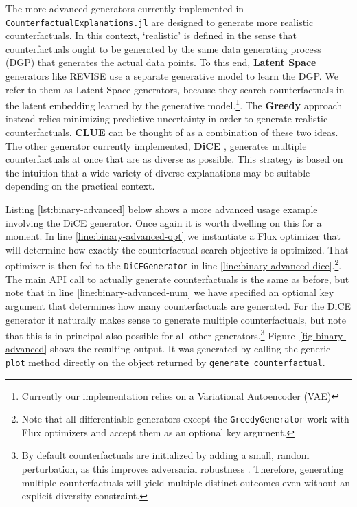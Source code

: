 \documentclass[
  letterpaper,
  DIV=11,
  numbers=noendperiod]{scrartcl}
\begin{document}
The more advanced generators currently implemented in
\texttt{CounterfactualExplanations.jl} are designed to generate more
realistic counterfactuals. In this context, `realistic' is defined in
the sense that counterfactuals ought to be generated by the same data
generating process (DGP) that generates the actual data points. To this
end, \textbf{Latent Space} generators like REVISE
\cite{joshi2019realistic} use a separate generative model to learn the
DGP. We refer to them as Latent Space generators, because they search
counterfactuals in the latent embedding learned by the generative
model.\footnote{Currently our implementation relies on a Variational
  Autoencoder (VAE)}. The \textbf{Greedy} approach
\cite{schut2021generating} instead relies minimizing predictive
uncertainty in order to generate realistic counterfactuals.
\textbf{CLUE} \cite{antoran2020getting} can be thought of as a
combination of these two ideas. The other generator currently
implemented, \textbf{DiCE} \cite{mothilal2020explaining}, generates
multiple counterfactuals at once that are as diverse as possible. This
strategy is based on the intuition that a wide variety of diverse
explanations may be suitable depending on the practical context.

Listing \ref{lst:binary-advanced} below shows a more advanced usage
example involving the DiCE generator. Once again it is worth dwelling on
this for a moment. In line \ref{line:binary-advanced-opt} we instantiate
a Flux optimizer that will determine how exactly the counterfactual
search objective is optimized. That optimizer is then fed to the
\texttt{DiCEGenerator} in line
\ref{line:binary-advanced-dice}.\footnote{Note that all differentiable
  generators except the \texttt{GreedyGenerator} work with Flux
  optimizers and accept them as an optional key argument.}. The main API
call to actually generate counterfactuals is the same as before, but
note that in line \ref{line:binary-advanced-num} we have specified an
optional key argument that determines how many counterfactuals are
generated. For the DiCE generator it naturally makes sense to generate
multiple counterfactuals, but note that this is in principal also
possible for all other generators.\footnote{By default counterfactuals
  are initialized by adding a small, random perturbation, as this
  improves adversarial robustness \cite{slack2021counterfactual}.
  Therefore, generating multiple counterfactuals will yield multiple
  distinct outcomes even without an explicit diversity constraint.}
Figure~\ref{fig-binary-advanced} shows the resulting output. It was
generated by calling the generic \texttt{plot} method directly on the
object returned by \texttt{generate\_counterfactual}.
\end{document}
